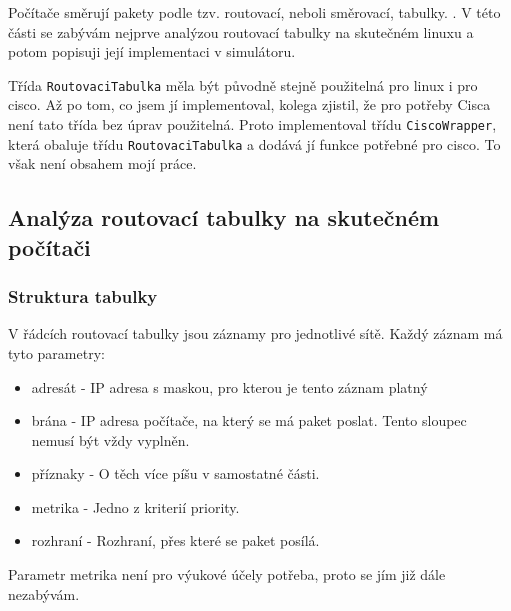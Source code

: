 
Počítače směrují pakety podle tzv. routovací, neboli směrovací, tabulky. \cite{owebu:routovaci_tabulka}. V této části se zabývám nejprve analýzou routovací tabulky na skutečném linuxu a potom popisuji její implementaci v simulátoru.

Třída \verb|RoutovaciTabulka| měla být původně stejně použitelná pro linux i pro cisco. Až po tom, co jsem jí implementoval, kolega zjistil, že pro potřeby Cisca není tato třída bez úprav použitelná. Proto implementoval třídu \verb|CiscoWrapper|, která obaluje třídu \verb|RoutovaciTabulka| a dodává jí funkce potřebné pro cisco. To však není obsahem mojí práce.


\subsection{Analýza routovací tabulky na skutečném počítači}

\subsubsection{Struktura tabulky}

V řádcích routovací tabulky jsou záznamy pro jednotlivé sítě. Každý záznam má tyto parametry:
\begin{itemize}
\item adresát - IP adresa s maskou, pro kterou je tento záznam platný
\item brána - IP adresa počítače, na který se má paket poslat. Tento sloupec nemusí být vždy vyplněn.
\item příznaky - O těch více píšu v samostatné části.
\item metrika - Jedno z kriterií priority.
\item rozhraní - Rozhraní, přes které se paket posílá.
\end{itemize}
Parametr metrika není pro výukové účely potřeba, proto se jím již dále nezabývám.

